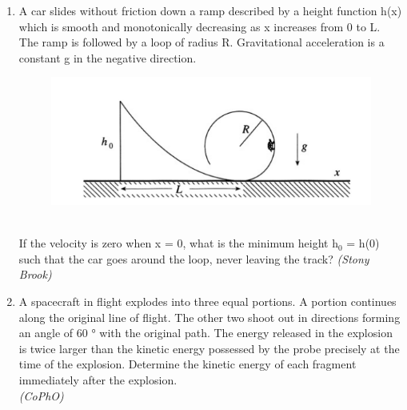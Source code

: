 \begin{enumerate}
\item A car slides without friction down a ramp described by a height function h(x)
which is smooth and monotonically decreasing as x increases from 0
to L. The ramp is followed by a loop of radius R. Gravitational acceleration 
is a constant g in the negative direction.\\ 
\begin{figure}[htp]
    \centering
    \includegraphics{figures/kinem/kinem2.PNG}
    \label{fig:my_label}
\end{figure}\\
If the velocity is zero when x = 0, what is the minimum height h$_0$ = h(0)
such that the car goes around the loop, never leaving the track?
\hfill \textsl{(Stony Brook)}\\
\big[\textbf{Ans: }h$_0$ = $\dfrac{5}{2}$R\big]
\item A spacecraft in flight explodes into three equal portions. A portion continues along the original line of 
flight. The other two shoot out in directions forming an angle of 60 ° with the original path. The energy 
released in the explosion is twice larger than the kinetic energy possessed by the probe precisely at the time of the 
explosion. Determine the kinetic energy of each fragment immediately after the explosion. \\\hfill \textsl{(CoPhO)}


\end{enumerate}
